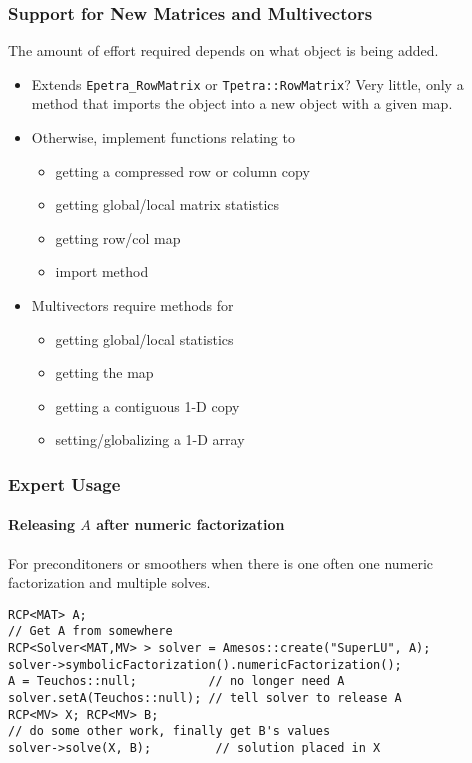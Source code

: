 \documentclass[xcolor=dvipsnames]{beamer}
\begin{document}
\begin{frame}
  \frametitle{Support for New Matrices and Multivectors}

  The amount of effort required depends on what object is being added.

  \begin{itemize}
    \item Extends \texttt{Epetra\_RowMatrix} or
      \texttt{Tpetra::RowMatrix}?  Very little, only a method that
      imports the object into a new object with a given map.
    \item Otherwise, implement functions relating to
      \begin{itemize}
        \item getting a compressed row or column copy
        \item getting global/local matrix statistics
        \item getting row/col map
        \item import method
      \end{itemize}
    \item Multivectors require methods for
      \begin{itemize}
        \item getting global/local statistics
        \item getting the map
        \item getting a contiguous 1-D copy
        \item setting/globalizing a 1-D array
      \end{itemize}
  \end{itemize}
\end{frame}

\begin{frame}[fragile]
  \frametitle{Expert Usage}
  \framesubtitle{Releasing $A$ after numeric factorization}
  
  For preconditoners or smoothers when there is one often one numeric
  factorization and multiple solves.
  
  \begin{lstlisting}
RCP<MAT> A;
// Get A from somewhere
RCP<Solver<MAT,MV> > solver = Amesos::create("SuperLU", A);
solver->symbolicFactorization().numericFactorization();
A = Teuchos::null;          // no longer need A
solver.setA(Teuchos::null); // tell solver to release A
RCP<MV> X; RCP<MV> B;
// do some other work, finally get B's values
solver->solve(X, B);         // solution placed in X
  \end{lstlisting}
\end{frame}
\end{document}
